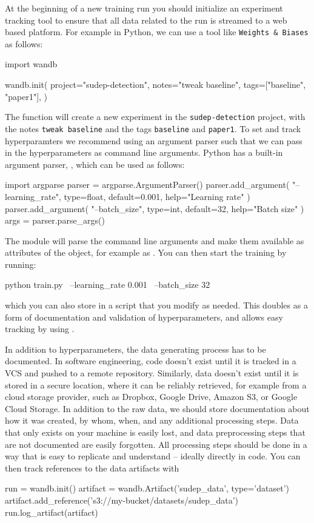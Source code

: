 At the beginning of a new training run you should initialize an experiment tracking tool to ensure that all data related to the run is streamed to a web based platform.
For example in Python, we can use a tool like \texttt{Weights \& Biases} as follows:
\begin{python}
import wandb

wandb.init(
  project="sudep-detection",
  notes="tweak baseline",
  tags=["baseline", "paper1"],
)
\end{python}
The  function will create a new experiment in the \texttt{sudep-detection} project, with the notes \texttt{tweak baseline} and the tags \texttt{baseline} and \texttt{paper1}.
To set and track hyperparamters we recommend using an argument parser such that we can pass in the hyperparameters as command line arguments.
Python has a built-in argument parser, , which can be used as follows:
\begin{python}
import argparse
parser = argparse.ArgumentParser()
parser.add_argument(
    "--learning_rate",
    type=float,
    default=0.001,
    help="Learning rate"
)
parser.add_argument(
    "--batch_size",
    type=int,
    default=32,
    help="Batch size"
)
args = parser.parse_args()
\end{python}
The  module will parse the command line arguments and make them available as attributes of the  object, for example as .
You can then start the training by running:
\begin{python}
python train.py \
    --learning_rate 0.001 \
    --batch_size 32
\end{python}
which you can also store in a script that you modify as needed.
This doubles as a form of documentation and validation of hyperparameters, and allows easy tracking by using .

In addition to hyperparameters, the data generating process has to be documented.
In software engineering, code doesn't exist until it is tracked in a VCS and pushed to a remote repository.
Similarly, data doesn't exist until it is stored in a secure location, where it can be reliably retrieved, for example from a cloud storage provider, such as Dropbox, Google Drive, Amazon S3, or Google Cloud Storage.
In addition to the raw data, we should store documentation about how it was created, by whom, when, and any additional processing steps.
Data that only exists on your machine is easily lost, and data preprocessing steps that are not documented are easily forgotten.
All processing steps should be done in a way that is easy to replicate and understand -- ideally directly in code.
You can then track references to the data artifacts with
\begin{python}
run = wandb.init()
artifact = wandb.Artifact('sudep_data', type='dataset')
artifact.add_reference('s3://my-bucket/datasets/sudep_data')
run.log_artifact(artifact)
\end{python}

